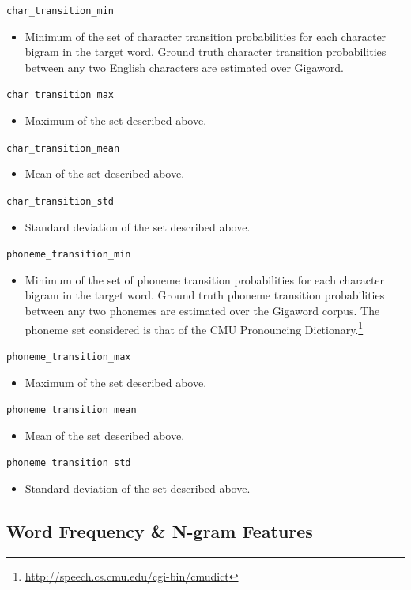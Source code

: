 \documentclass[11pt,a4paper]{article}
\begin{document}
\texttt{char\_transition\_min}
\begin{itemize}
  \item Minimum of the set of character transition probabilities for each character bigram in the target word. Ground truth character transition probabilities between any two English characters are estimated over Gigaword.
\end{itemize}
\texttt{char\_transition\_max}
\begin{itemize}
  \item Maximum of the set described above.
\end{itemize}
\texttt{char\_transition\_mean}
\begin{itemize}
  \item Mean of the set described above.
\end{itemize}
\texttt{char\_transition\_std}
\begin{itemize}
  \item Standard deviation of the set described above.
\end{itemize}
\texttt{phoneme\_transition\_min}
\begin{itemize}
  \item Minimum of the set of phoneme transition probabilities for each character bigram in the target word. Ground truth phoneme transition probabilities between any two phonemes are estimated over the Gigaword corpus. The phoneme set considered is that of the CMU Pronouncing Dictionary.\footnote{\url{http://speech.cs.cmu.edu/cgi-bin/cmudict}}
\end{itemize}
\texttt{phoneme\_transition\_max}
\begin{itemize}
  \item Maximum of the set described above.
\end{itemize}
\texttt{phoneme\_transition\_mean}
\begin{itemize}
  \item Mean of the set described above.
\end{itemize}
\texttt{phoneme\_transition\_std}
\begin{itemize}
  \item Standard deviation of the set described above.
\end{itemize}

\subsection{Word Frequency \& N-gram Features}
\end{document}
